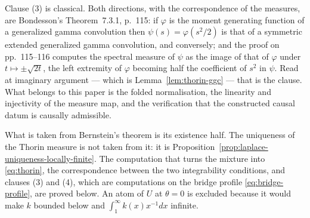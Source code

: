 Clause (3) is classical. Both directions, with the correspondence of the measures, are
Bondesson's Theorem~7.3.1, p.~115: if $\varphi$ is the moment generating function of a
generalized gamma convolution then $\psi(s) = \varphi(s^2/2)$ is that of a symmetric extended
generalized gamma convolution, and conversely; and the proof on pp.~115--116 computes the
spectral measure of $\psi$ as the image of that of $\varphi$ under $t \mapsto \pm\sqrt{2t}$, the
left extremity of $\varphi$ becoming half the coefficient of $s^2$ in $\psi$. Read at imaginary
argument --- which is Lemma~\ref{lem:thorin-ggc} --- that is the clause. What belongs to this
paper is the folded normalisation, the linearity and injectivity of the measure map, and the
verification that the constructed causal datum is causally admissible.

What is taken from Bernstein's theorem is its existence half. The uniqueness of the Thorin
measure is not taken from it: it is Proposition~\ref{prop:laplace-uniqueness-locally-finite}.
The computation that turns the mixture into \ref{eq:thorin}, the correspondence between the
two integrability conditions, and clauses (3) and (4), which are computations on the bridge
profile \ref{eq:bridge-profile}, are proved below. An atom of $U$ at $\theta = 0$ is excluded
because it would make $k$ bounded below and $\int_1^\infty k(x)x^{-1}dx$ infinite.


